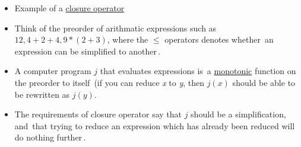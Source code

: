 
\begin{itemize}
    \item Example of a \href{doc/1 math/Seven Sketches in Compositionality/Chapter 1: Generative Effects/6 Galois connections/4 Closure operators/1 Closure operator}{closure operator}
    \item Think of the preorder of arithmatic expressions such as $12, 4+2+4, 9*(2+3)$, where the $\leq$ operators denotes whether \,an expression can be simplified to another\,.
    \item A computer program $j$ that evaluates expressions is \,a \href{doc/1 math/Seven Sketches in Compositionality/Chapter 1: Generative Effects/4 Monotone maps/1 Monotone map}{monotonic} function on the preorder to itself\, (if you can reduce \emph{x} to \emph{y}, then $j(x)$ should be able to be rewritten as $j(y)$.
    \item The requirements of closure operator say that $j$ should be a simplification, and \,that trying to reduce an expression which has already been reduced will do nothing further\,.
  \end{itemize}